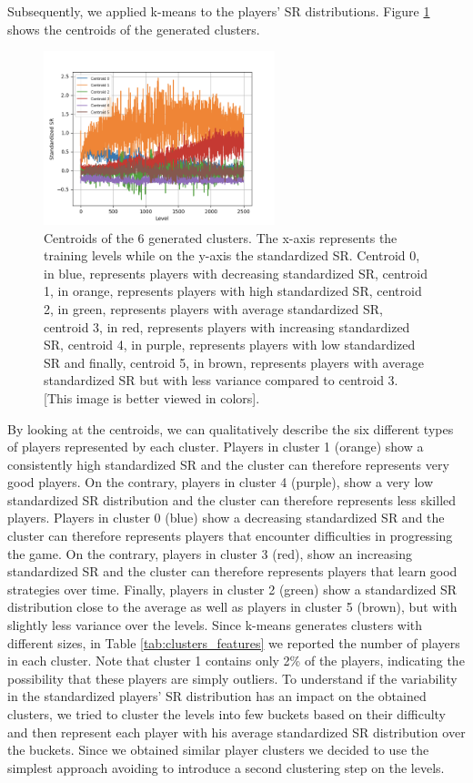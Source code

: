 \noindent
Subsequently, we applied k-means to the players' SR distributions. Figure \ref{fig:k_means} shows the centroids of the generated clusters. 
\begin{figure}[h!]
  \centering
    \includegraphics[width=0.6\textwidth]{masters-thesis-master/masters-thesis/contents/04_results/clustering_players_images/centroids_6_clusters.png}
    \caption{Centroids of the 6 generated clusters. The x-axis represents the training levels while on the y-axis the standardized SR. Centroid 0, in blue, represents players with decreasing standardized SR, centroid 1, in orange, represents players with high standardized SR, centroid 2, in green, represents players with average standardized SR, centroid 3, in red, represents players with increasing standardized SR, centroid 4, in purple, represents players with low standardized SR and finally, centroid 5, in brown, represents players with average standardized SR but with less variance compared to centroid 3. [This image is better viewed in colors].
    }
    \label{fig:k_means}
\end{figure}
By looking at the centroids, we can qualitatively describe the six different types of players represented by each cluster. Players in cluster 1 (orange) show a consistently high standardized SR and the cluster can therefore represents very good players. On the contrary, players in cluster 4 (purple), show a very low standardized SR distribution and the cluster can therefore represents less skilled players. 
Players in cluster 0 (blue) show a decreasing standardized SR and the cluster can therefore represents players that encounter difficulties in progressing the game. On the contrary, players in cluster 3 (red), show an increasing standardized SR and the cluster can therefore represents players that learn good strategies over time. Finally, players in cluster 2 (green) show a standardized SR distribution close to the average as well as players in cluster 5 (brown), but with slightly less variance over the levels.
Since k-means generates clusters with different sizes, in Table \ref{tab:clusters_features} we reported the number of players in each cluster. Note that cluster 1 contains only 2\% of the players, indicating the possibility that these players are simply outliers. To understand if the variability in the standardized players' SR distribution has an impact on the obtained clusters, we tried to cluster the levels into few buckets based on their difficulty and then represent each player with his average standardized SR distribution over the buckets. Since we obtained similar player clusters we decided to use the simplest approach avoiding to introduce a second clustering step on the levels.


